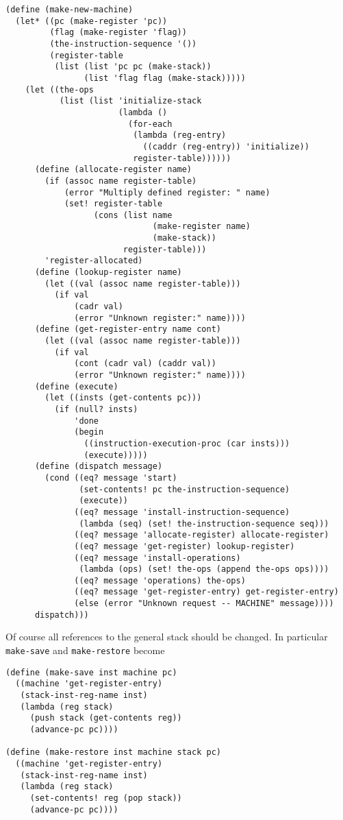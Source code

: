 \documentclass[a4paper,12pt]{article}
\begin{document}
\begin{lstlisting}
(define (make-new-machine)
  (let* ((pc (make-register 'pc))
         (flag (make-register 'flag))
         (the-instruction-sequence '())
         (register-table
          (list (list 'pc pc (make-stack))
                (list 'flag flag (make-stack)))))
    (let ((the-ops
           (list (list 'initialize-stack
                       (lambda ()
                         (for-each
                          (lambda (reg-entry)
                            ((caddr (reg-entry)) 'initialize))
                          register-table))))))
      (define (allocate-register name)
        (if (assoc name register-table)
            (error "Multiply defined register: " name)
            (set! register-table
                  (cons (list name
                              (make-register name)
                              (make-stack))
                        register-table)))
        'register-allocated)
      (define (lookup-register name)
        (let ((val (assoc name register-table)))
          (if val
              (cadr val)
              (error "Unknown register:" name))))
      (define (get-register-entry name cont)
        (let ((val (assoc name register-table)))
          (if val
              (cont (cadr val) (caddr val))
              (error "Unknown register:" name))))
      (define (execute)
        (let ((insts (get-contents pc)))
          (if (null? insts)
              'done
              (begin
                ((instruction-execution-proc (car insts)))
                (execute)))))
      (define (dispatch message)
        (cond ((eq? message 'start)
               (set-contents! pc the-instruction-sequence)
               (execute))
              ((eq? message 'install-instruction-sequence)
               (lambda (seq) (set! the-instruction-sequence seq)))
              ((eq? message 'allocate-register) allocate-register)
              ((eq? message 'get-register) lookup-register)
              ((eq? message 'install-operations)
               (lambda (ops) (set! the-ops (append the-ops ops))))
              ((eq? message 'operations) the-ops)
              ((eq? message 'get-register-entry) get-register-entry)
              (else (error "Unknown request -- MACHINE" message))))
      dispatch)))
\end{lstlisting}

Of course all references to the general stack should be changed.  In
particular \lstinline!make-save! and \lstinline!make-restore! become

\begin{lstlisting}
(define (make-save inst machine pc)
  ((machine 'get-register-entry)
   (stack-inst-reg-name inst)
   (lambda (reg stack)
     (push stack (get-contents reg))
     (advance-pc pc))))

(define (make-restore inst machine stack pc)
  ((machine 'get-register-entry)
   (stack-inst-reg-name inst)
   (lambda (reg stack)
     (set-contents! reg (pop stack))
     (advance-pc pc))))
\end{lstlisting}
\end{document}
